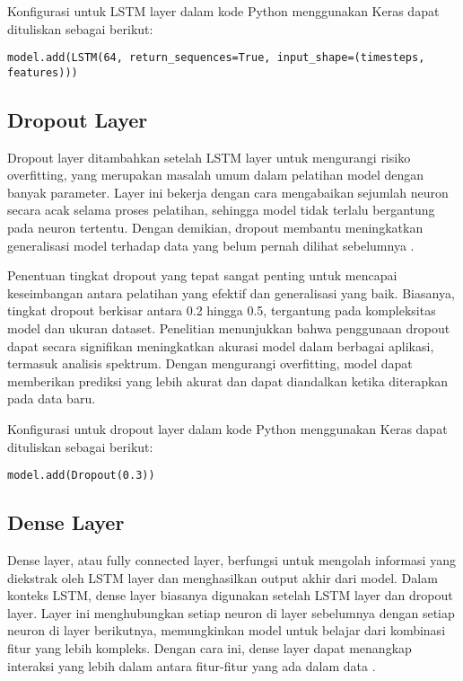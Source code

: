 \par Konfigurasi untuk LSTM layer dalam kode Python menggunakan Keras dapat dituliskan sebagai berikut:
\begin{minipage}{\textwidth}
\begin{verbatim}
model.add(LSTM(64, return_sequences=True, input_shape=(timesteps, features)))
\end{verbatim}
\end{minipage}

\subsection{Dropout Layer}
\par Dropout layer ditambahkan setelah LSTM layer untuk mengurangi risiko overfitting, yang merupakan masalah umum dalam pelatihan model dengan banyak parameter. Layer ini bekerja dengan cara mengabaikan sejumlah neuron secara acak selama proses pelatihan, sehingga model tidak terlalu bergantung pada neuron tertentu. Dengan demikian, dropout membantu meningkatkan generalisasi model terhadap data yang belum pernah dilihat sebelumnya \cite{bengio2012}.

\par Penentuan tingkat dropout yang tepat sangat penting untuk mencapai keseimbangan antara pelatihan yang efektif dan generalisasi yang baik. Biasanya, tingkat dropout berkisar antara 0.2 hingga 0.5, tergantung pada kompleksitas model dan ukuran dataset. Penelitian menunjukkan bahwa penggunaan dropout dapat secara signifikan meningkatkan akurasi model dalam berbagai aplikasi, termasuk analisis spektrum. Dengan mengurangi overfitting, model dapat memberikan prediksi yang lebih akurat dan dapat diandalkan ketika diterapkan pada data baru.

\par Konfigurasi untuk dropout layer dalam kode Python menggunakan Keras dapat dituliskan sebagai berikut:
\begin{minipage}{\textwidth}
\begin{verbatim}
model.add(Dropout(0.3))
\end{verbatim}
\end{minipage}

\subsection{Dense Layer}
\par Dense layer, atau fully connected layer, berfungsi untuk mengolah informasi yang diekstrak oleh LSTM layer dan menghasilkan output akhir dari model. Dalam konteks LSTM, dense layer biasanya digunakan setelah LSTM layer dan dropout layer. Layer ini menghubungkan setiap neuron di layer sebelumnya dengan setiap neuron di layer berikutnya, memungkinkan model untuk belajar dari kombinasi fitur yang lebih kompleks. Dengan cara ini, dense layer dapat menangkap interaksi yang lebih dalam antara fitur-fitur yang ada dalam data \cite{zhang2019}.

